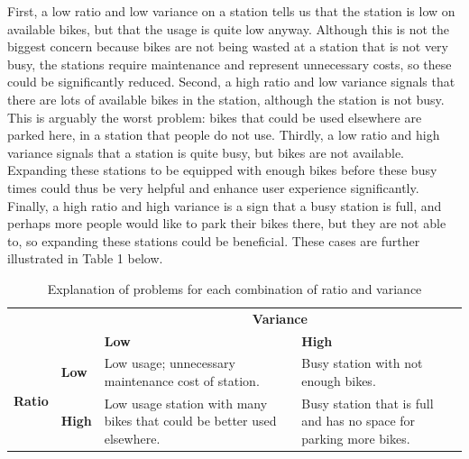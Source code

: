 \vspace{0.3cm}
\noindent First, a low ratio and low variance on a station tells us that the station is low on available bikes, but that the usage is quite low anyway. Although this is not the biggest concern because bikes are not being wasted at a station that is not very busy, the stations require maintenance and represent unnecessary costs, so these could be significantly reduced. Second, a high ratio and low variance signals that there are lots of available bikes in the station, although the station is not busy. This is arguably the worst problem: bikes that could be used elsewhere are parked here, in a station that people do not use. Thirdly, a low ratio and high variance signals that a station is quite busy, but bikes are not available. Expanding these stations to be equipped with enough bikes before these busy times could thus be very helpful and enhance user experience significantly. Finally, a high ratio and high variance is a sign that a busy station is full, and perhaps more people would like to park their bikes there, but they are not able to, so expanding these stations could be beneficial. These cases are further illustrated in Table 1 below. 

\begin{table}[h]
\centering
\caption{Explanation of problems for each combination of ratio and variance}
\begin{tabular}{|l|l|p{5cm}|p{5cm}|}
\hline
\multicolumn{2}{|c|}{} & \multicolumn{2}{c|}{\textbf{Variance}} \\
\cline{3-4}
\multicolumn{2}{|c|}{} & \textbf{Low} & \textbf{High} \\
\hline
\multirow{2}{*}{\textbf{Ratio}} & \textbf{Low} & Low usage; unnecessary maintenance cost of station. & Busy station with not enough bikes. \\
\cline{2-4}
& \textbf{High} & Low usage station with many bikes that could be better used elsewhere. & Busy station that is full and has no space for parking more bikes. \\
\hline
\end{tabular}
\label{tab:problem_explanation}
\end{table}

